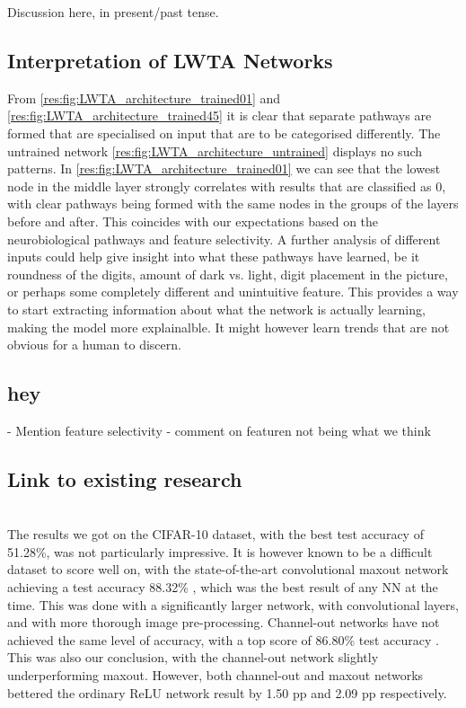 Discussion here, in present/past tense.

\subsection{Interpretation of LWTA Networks}
    From \cref{res:fig:LWTA_architecture_trained01} and \cref{res:fig:LWTA_architecture_trained45} it is clear that separate pathways are formed that are specialised on input that are to be categorised differently. The untrained network \cref{res:fig:LWTA_architecture_untrained} displays no such patterns. In \cref{res:fig:LWTA_architecture_trained01} we can see that the lowest node in the middle layer strongly correlates with results that are classified as 0, with clear pathways being formed with the same nodes in the groups of the layers before and after. This coincides with our expectations based on the neurobiological pathways and feature selectivity. A further analysis of different inputs could help give insight into what these pathways have learned, be it roundness of the digits, amount of dark vs. light, digit placement in the picture, or perhaps some completely different and unintuitive feature. This provides a way to start extracting information about what the network is actually learning, making the model more explainalble. It might however learn trends that are not obvious for a human to discern. 



\subsection{hey}
 - Mention feature selectivity
 - comment on featuren not being what we think

\subsection{Link to existing research}
     \\
    The results we got on the CIFAR-10 dataset, with the best test accuracy of 51.28\%, was not particularly impressive. It is however known to be a difficult dataset to score well on, with the state-of-the-art convolutional maxout network achieving a test accuracy 88.32\% \citep{Maxout_Networks}, which was the best result of any NN at the time. This was done with a significantly larger network, with convolutional layers, and with more thorough image pre-processing. Channel-out networks have not achieved the same level of accuracy, with a top score of 86.80\% test accuracy \citep{Wang}. This was also our conclusion, with the channel-out network slightly underperforming maxout. However, both channel-out and maxout networks bettered the ordinary ReLU network result by 1.50 pp and 2.09 pp respectively.

